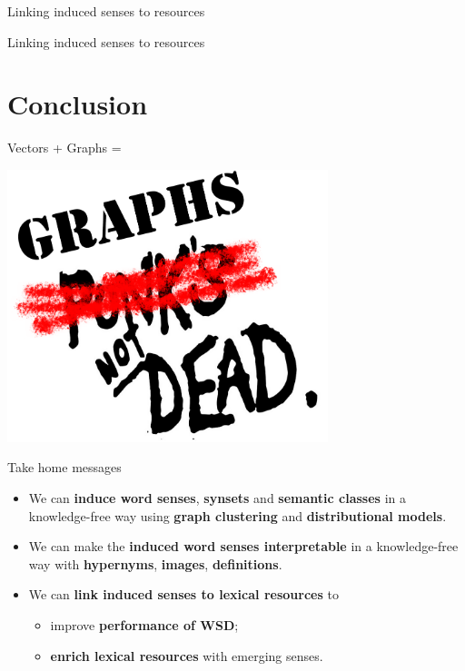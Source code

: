 \documentclass[usenames,dvipsnames]{beamer}
\begin{document}
\begin{frame}{ Linking induced senses to resources }
	
\end{frame}


\begin{frame}{ Linking induced senses to resources }
	
\end{frame}


\section{Conclusion}


\begin{frame}{Vectors + Graphs = \heartsuit }

\centering 
\includegraphics[width=0.7\textwidth]{graphs}

\end{frame}

\begin{frame}{Take home messages}

\begin{itemize}
	\item We can \alert{\textbf{induce word senses}}, \alert{\textbf{synsets}} and \alert{\textbf{semantic classes}} in a knowledge-free way using \textbf{graph clustering} and \textbf{distributional models}.
    \vspace{1em}
    \pause
    
	\item We can make the \alert{\textbf{induced word senses interpretable}} in a knowledge-free way with \textbf{hypernyms}, \textbf{images},  \textbf{definitions}. 
	\vspace{1em}
    \pause
	
	\item We can \alert{\textbf{link induced senses to lexical resources}} to
	\begin{itemize} 
		\item improve \textbf{performance of WSD};
		\item \textbf{enrich lexical resources} with emerging senses.
	\end{itemize}
	
\end{itemize}


\end{frame}
\end{document}
